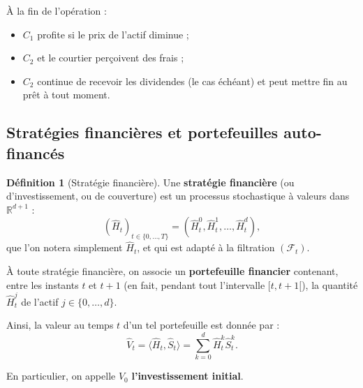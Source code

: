 \documentclass[12pt,a4paper]{article}
\numberwithin{equation}{section}
\theoremstyle{plain} %
\theoremstyle{definition} %
\newtheorem{definition}{Définition}          %
\theoremstyle{remark} %
\theoremstyle{myexample}
\theoremstyle{definition}
\newcommand{\RR}{\mathbb{R}}
\begin{document}
\begin{center}
\end{center}

À la fin de l’opération :
\begin{itemize}
  \item \(C_1\) profite si le prix de l’actif diminue ;
  \item \(C_2\) et le courtier perçoivent des frais ;
  \item \(C_2\) continue de recevoir les dividendes (le cas échéant) et peut mettre fin au prêt à tout moment.
\end{itemize}


\subsection{Stratégies financières et portefeuilles auto-financés}

\begin{definition}[Stratégie financière]
Une \textbf{stratégie financière} (ou d’investissement, ou de couverture) est un processus stochastique à valeurs dans $\RR^{d+1}$ :
\[
(\hat H_t)_{t\in\{0,\ldots,T\}} = (\hat H_t^0, \hat H_t^1, \ldots, \hat H_t^d),
\]
que l’on notera simplement $\hat H_t$, et qui est adapté à la filtration $(\mathcal{F}_t)$.

À toute stratégie financière, on associe un \textbf{portefeuille financier} contenant, entre les instants $t$ et $t+1$ (en fait, pendant tout l’intervalle $[t,t+1[$), la quantité $\hat H_t^j$ de l’actif $j \in \{0,\ldots,d\}$.

Ainsi, la valeur au temps $t$ d’un tel portefeuille est donnée par :
\[
\hat V_t = \langle \hat H_t, \hat S_t \rangle = \sum_{k=0}^d \hat H_t^k \hat S_t^k.
\]

En particulier, on appelle $\hat V_0$ \textbf{l’investissement initial}.
\end{definition}
\end{document}
